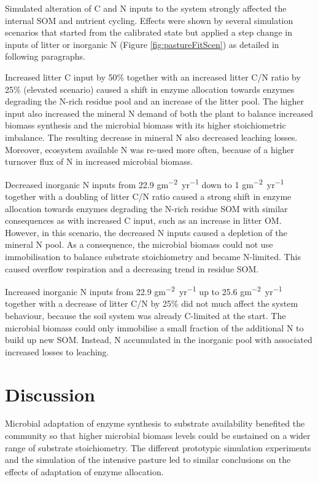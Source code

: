 Simulated alteration of C and N inputs to the system strongly affected the
internal SOM and nutrient cycling. Effects were shown by several
simulation scenarios that started from the calibrated state but applied a step change in
inputs of litter or inorganic N (Figure \ref{fig:pastureFitScen}) as detailed
in following paragraphs.

Increased litter C input by 50\% together with an increased litter C/N ratio by
25\% (elevated  scenario) caused a shift in enzyme allocation towards
enzymes degrading the N-rich residue pool and an increase of the litter pool.
The higher input also increased the mineral N demand of both the plant to
balance increased biomass synthesis and the microbial biomass with its higher
stoichiometric imbalance. The resulting decrease in mineral N also decreased
leaching losses. Moreover, ecosystem available N was re-used more often, because
of a higher turnover flux of N in increased microbial biomass.

Decreased inorganic N inputs from 22.9
\unit{gm^{-2}yr^{-1}} down to 1
\unit{gm^{-2}yr^{-1}} together with a doubling of litter C/N
ratio caused a strong shift in enzyme allocation towards enzymes degrading the
N-rich residue SOM with similar consequences as with increased C input,
such as an increase in litter OM. However, in this scenario, the decreased N inputs caused
a depletion of the mineral N pool.
As a consequence, the microbial biomass could not use immobilisation to
balance substrate stoichiometry and became N-limited.
This caused overflow respiration and a decreasing trend in residue SOM.

Increased inorganic N inputs from 22.9 \unit{gm^{-2}yr^{-1}} up to 25.6
\unit{gm^{-2}yr^{-1}} together with a decrease of litter C/N by 25\% did not
much affect the system behaviour, because the soil system was already C-limited
at the start. The microbial biomass could only immobilise a small fraction of the additional N to build 
up new SOM. Instead, N accumulated in the inorganic pool with associated
increased losses to leaching.

\section{Discussion}
Microbial adaptation of enzyme synthesis to substrate availability benefited the
community so that higher microbial biomass levels could be sustained on a wider
range of substrate stoichiometry.
The different prototypic simulation experiments and the simulation of the
intensive pasture led to similar conclusions on the effects of adaptation of
enzyme allocation.

